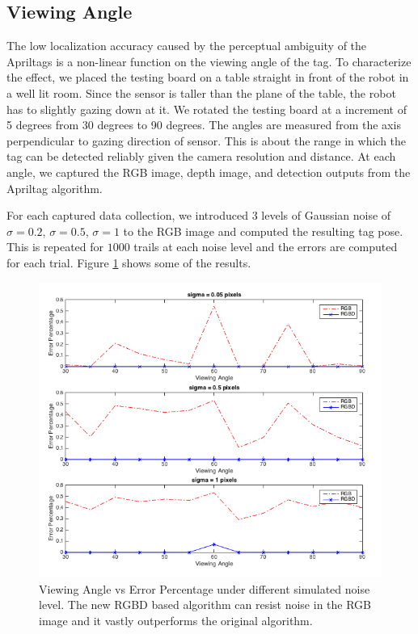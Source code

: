 \subsection{Viewing Angle}

The low localization accuracy caused by the perceptual ambiguity of the Apriltags is a non-linear function on the viewing angle of the tag. To characterize the effect, we placed the testing board on a table straight in front of the robot in a well lit room. Since the sensor is taller than the plane of the table, the robot has to slightly gazing down at it.  We rotated the testing board at a increment of 5 degrees from 30 degrees to 90 degrees. The angles are measured from the axis perpendicular to gazing direction of sensor. This is about the range in which the tag can be detected reliably given the camera resolution and distance. At each angle, we captured the RGB image, depth image, and detection outputs from the Apriltag algorithm. 

For each captured data collection, we introduced 3 levels of Gaussian noise of $\sigma = 0.2$, $\sigma = 0.5$, $\sigma = 1$  to the RGB image and computed the resulting tag pose. This is repeated for $1000$ trails at each noise level and the errors are computed for each trial. Figure \ref{fig:viewing_result} shows some of the results. 
\begin{figure}
\centering
\includegraphics[width=\columnwidth]{figs/viewing_angle_fig1}
\caption{Viewing Angle vs Error Percentage under different simulated noise level. The new RGBD based algorithm can resist noise in the RGB image and it vastly outperforms the original algorithm.}
\label{fig:viewing_result}
\end{figure}


